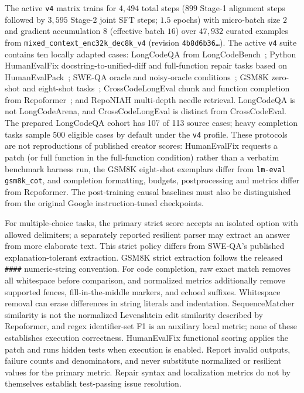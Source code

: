 \documentclass[10pt,twocolumn]{article}
\begin{document}
The active \texttt{v4} matrix trains for $4{,}494$ total steps ($899$ Stage-1 alignment steps followed by $3{,}595$ Stage-2 joint SFT steps; $1.5$ epochs) with micro-batch size $2$ and gradient accumulation $8$ (effective batch $16$) over $47{,}932$ curated examples from \texttt{mixed\_context\_enc32k\_dec8k\_v4} (revision \texttt{4b8d6b36\ldots}). The active \texttt{v4} suite contains ten locally adapted cases: LongCodeQA from LongCodeBench~\cite{longcodebench_2025}; Python HumanEvalFix docstring-to-unified-diff and full-function repair tasks based on HumanEvalPack~\cite{muennighoff2023octopack}; SWE-QA oracle and noisy-oracle conditions~\cite{sweqa_2026}; GSM8K zero-shot and eight-shot tasks~\cite{cobbe2021training}; CrossCodeLongEval chunk and function completion from Repoformer~\cite{repoformer_2024}; and RepoNIAH multi-depth needle retrieval. LongCodeQA is not LongCodeArena, and CrossCodeLongEval is distinct from CrossCodeEval. The prepared LongCodeQA cohort has 107 of 113 source cases; heavy completion tasks sample 500 eligible cases by default under the \texttt{v4} profile. These protocols are not reproductions of published creator scores: HumanEvalFix requests a patch (or full function in the full-function condition) rather than a verbatim benchmark harness run, the GSM8K eight-shot exemplars differ from \texttt{lm-eval gsm8k\_cot}, and completion formatting, budgets, postprocessing and metrics differ from Repoformer. The post-training causal baselines must also be distinguished from the original Google instruction-tuned checkpoints.

For multiple-choice tasks, the primary strict score accepts an isolated option with allowed delimiters; a separately reported resilient parser may extract an answer from more elaborate text. This strict policy differs from SWE-QA's published explanation-tolerant extraction. GSM8K strict extraction follows the released \texttt{\#\#\#\#} numeric-string convention. For code completion, raw exact match removes all whitespace before comparison, and normalized metrics additionally remove supported fences, fill-in-the-middle markers, and echoed suffixes. Whitespace removal can erase differences in string literals and indentation. SequenceMatcher similarity is not the normalized Levenshtein edit similarity described by Repoformer, and regex identifier-set F1 is an auxiliary local metric; none of these establishes execution correctness. HumanEvalFix functional scoring applies the patch and runs hidden tests when execution is enabled. Report invalid outputs, failure counts and denominators, and never substitute normalized or resilient values for the primary metric. Repair syntax and localization metrics do not by themselves establish test-passing issue resolution.
\end{document}
